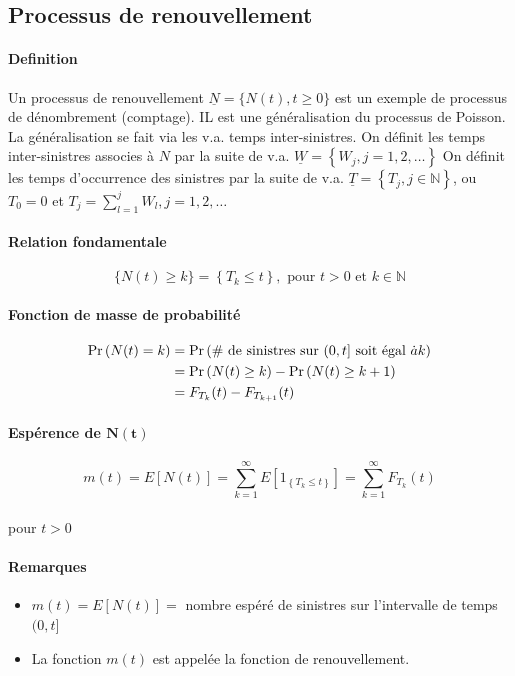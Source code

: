 \subsection{Processus de renouvellement}
\paragraph{Definition}
Un processus de renouvellement $\underline{N}=\{N(t), t \geq 0\}$ est un exemple de  processus de dénombrement (comptage). IL est une généralisation du processus de Poisson. La généralisation se fait via les v.a. temps inter-sinistres. On définit les temps inter-sinistres associes à $N$ par la suite de v.a. $\underline{W}=\left\{W_{j}, j=1,2, \ldots\right\}$ On définit les temps d'occurrence des sinistres par la suite de v.a. $\underline{T}=\left\{T_{j}, j \in \mathbb{N}\right\}$,  ou $T_{0}=0$ et $T_{j}=\sum_{l=1}^{j} W_{l}, j=1,2, \ldots$

\paragraph{Relation fondamentale} 
\[\{N(t) \geq k\}=\left\{T_{k} \leq t\right\}, \text { pour } t>0 \text { et } k \in \mathbb{N} \] 

\paragraph{Fonction de masse de probabilité}
\begin{align*}
    \Pr \left( N(t)=k \right) &=
    \Pr \left( \# \text { de sinistres sur }(0, t] \text { soit égal } \dot{a} k \right) \\
    &=\Pr \left( N(t) \geq k \right)-\Pr \left( N(t) \geq k+1 \right) \\  
    &= F_{T_{k}}(t)-F_{T_{k+1}}(t)
\end{align*}

\paragraph{Espérence de $\mathbf{N(t)}$}
\[ m(t)=E[N(t)]=\sum_{k=1}^{\infty} E\left[1_{\left\{T_{k} \leq t\right\}}\right]=\sum_{k=1}^{\infty} F_{T_{k}}(t) \] \\
pour $t>0$

\paragraph{Remarques}
\begin{itemize}
    \item $m(t)=E[N(t)]=$ nombre espéré de sinistres sur l'intervalle de temps $(0, t]$
    \item La fonction $ m(t)$ est appelée la fonction de renouvellement.
\end{itemize}

